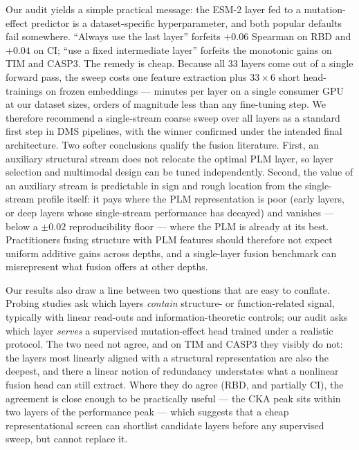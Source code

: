 \documentclass[11pt]{article}
\begin{document}
Our audit yields a simple practical message: the ESM-2 layer fed to a mutation-effect
predictor is a dataset-specific hyperparameter, and both popular defaults fail somewhere.
``Always use the last layer'' forfeits $+0.06$ Spearman on RBD and $+0.04$ on CI; ``use a
fixed intermediate layer'' forfeits the monotonic gains on TIM and CASP3. The remedy is
cheap. Because all 33 layers come out of a single forward pass, the sweep costs one feature
extraction plus $33 \times 6$ short head-trainings on frozen embeddings --- minutes per
layer on a single consumer GPU at our dataset sizes, orders of magnitude less than any
fine-tuning step. We therefore recommend a single-stream coarse sweep over all layers as a
standard first step in DMS pipelines, with the winner confirmed under the intended final
architecture. Two softer conclusions qualify the fusion literature. First, an auxiliary
structural stream does not relocate the optimal PLM layer, so layer selection and multimodal
design can be tuned independently. Second, the value of an auxiliary stream is predictable
in sign and rough location from the single-stream profile itself: it pays where the PLM
representation is poor (early layers, or deep layers whose single-stream performance has
decayed) and vanishes --- below a $\pm 0.02$ reproducibility floor --- where the PLM is
already at its best. Practitioners fusing structure with PLM features should therefore not
expect uniform additive gains across depths, and a single-layer fusion benchmark can
misrepresent what fusion offers at other depths.

Our results also draw a line between two questions that are easy to conflate. Probing studies
ask which layers \emph{contain} structure- or function-related signal, typically with linear
read-outs and information-theoretic controls; our audit asks which layer \emph{serves} a
supervised mutation-effect head trained under a realistic protocol. The two need not agree,
and on TIM and CASP3 they visibly do not: the layers most linearly aligned with a structural
representation are also the deepest, and there a linear notion of redundancy understates what
a nonlinear fusion head can still extract. Where they do agree (RBD, and partially CI), the
agreement is close enough to be practically useful --- the CKA peak sits within two layers of
the performance peak --- which suggests that a cheap representational screen can shortlist
candidate layers before any supervised sweep, but cannot replace it.
\end{document}
